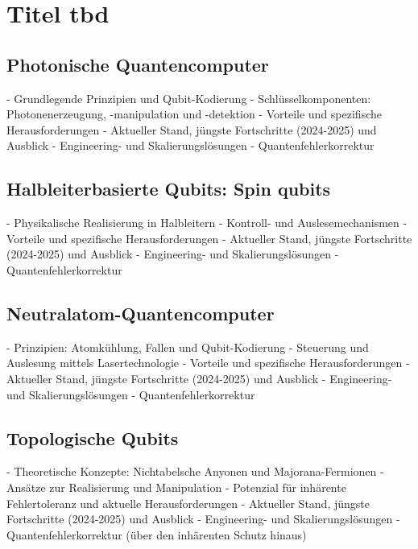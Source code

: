 \section{Titel tbd}
\subsection{Photonische Quantencomputer}
    - Grundlegende Prinzipien und Qubit-Kodierung
    - Schlüsselkomponenten: Photonenerzeugung, -manipulation und -detektion
    - Vorteile und spezifische Herausforderungen
    - Aktueller Stand, jüngste Fortschritte (2024-2025) und Ausblick
    - Engineering- und Skalierungslösungen
    - Quantenfehlerkorrektur

\subsection{Halbleiterbasierte Qubits: Spin qubits}
    - Physikalische Realisierung in Halbleitern
    - Kontroll- und Auslesemechanismen
    - Vorteile und spezifische Herausforderungen
    - Aktueller Stand, jüngste Fortschritte (2024-2025) und Ausblick
    - Engineering- und Skalierungslösungen
    - Quantenfehlerkorrektur

\subsection{Neutralatom-Quantencomputer}
    - Prinzipien: Atomkühlung, Fallen und Qubit-Kodierung
    - Steuerung und Auslesung mittels Lasertechnologie
    - Vorteile und spezifische Herausforderungen
    - Aktueller Stand, jüngste Fortschritte (2024-2025) und Ausblick
    - Engineering- und Skalierungslösungen
    - Quantenfehlerkorrektur

\subsection{Topologische Qubits}
    - Theoretische Konzepte: Nichtabelsche Anyonen und Majorana-Fermionen
    - Ansätze zur Realisierung und Manipulation
    - Potenzial für inhärente Fehlertoleranz und aktuelle Herausforderungen
    - Aktueller Stand, jüngste Fortschritte (2024-2025) und Ausblick
    - Engineering- und Skalierungslösungen
    - Quantenfehlerkorrektur (über den inhärenten Schutz hinaus)



